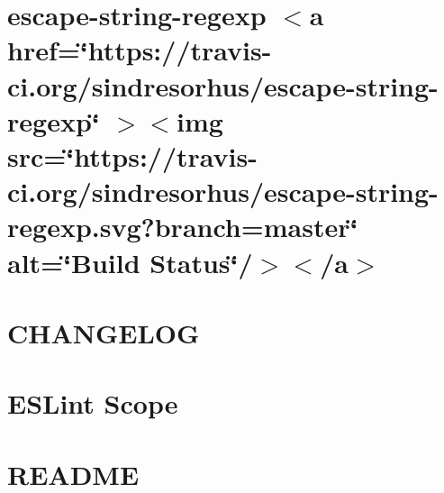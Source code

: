\documentclass[twoside]{book}
\newcommand{\+}{\discretionary{\mbox{\scriptsize$\hookleftarrow$}}{}{}}
\begin{document}
\chapter{escape-\/string-\/regexp \texorpdfstring{$<$}{<}a href=\char`\"{}https\+://travis-\/ci.\+org/sindresorhus/escape-\/string-\/regexp\char`\"{} \texorpdfstring{$>$}{>}\texorpdfstring{$<$}{<}img src=\char`\"{}https\+://travis-\/ci.\+org/sindresorhus/escape-\/string-\/regexp.\+svg?branch=master\char`\"{} alt=\char`\"{}\+Build Status\char`\"{}/\texorpdfstring{$>$}{>}\texorpdfstring{$<$}{<}/a\texorpdfstring{$>$}{>}}
\label{md__c___users_vaishnavi_jadhav__desktop__developer_code_mean_stack_example_client_node_modules_escape_string_regexp_readme}

\chapter{CHANGELOG}
\label{md__c___users_vaishnavi_jadhav__desktop__developer_code_mean_stack_example_client_node_modules_eslint_scope__c_h_a_n_g_e_l_o_g}

\chapter{ESLint Scope}
\label{md__c___users_vaishnavi_jadhav__desktop__developer_code_mean_stack_example_client_node_modules_eslint_scope__r_e_a_d_m_e}

\chapter{README}
\label{md__c___users_vaishnavi_jadhav__desktop__developer_code_mean_stack_example_client_node_modules_esprima__r_e_a_d_m_e}

\end{document}
